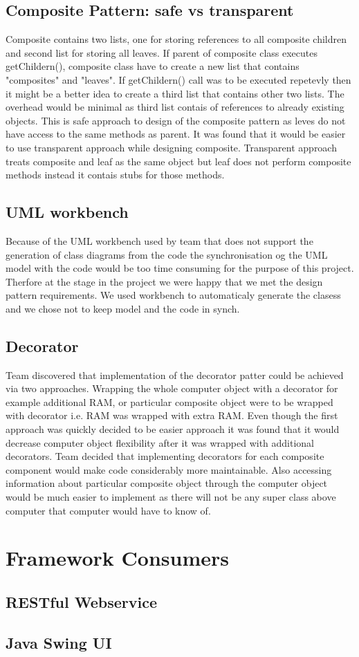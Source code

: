 \documentclass[pdftex,11pt,a4paper]{article}
\begin{document}
\subsection{Composite Pattern: safe vs transparent}
Composite contains two lists, one for storing references to all composite children and second list for storing all leaves. If parent of composite class executes getChildern(), composite class have to create a new list that contains "composites" and "leaves".
If getChildern() call was to be executed repetevly then it might be a better idea to create a third list that contains other two lists. The overhead would be minimal as third list contais of references to already existing objects.
This is safe approach to design of the composite pattern as leves do not have access to the same methods as parent. It was found that it would be easier to use transparent approach while designing composite. Transparent approach treats composite and leaf as the same object but leaf does not perform composite methods instead it contais stubs for those methods.

\subsection{UML workbench}
Because of the UML workbench used by team that does not support the generation of class diagrams from the code the synchronisation og the UML model with the code would be too time consuming for the purpose of this project. Therfore at the stage in the project we were happy that we met the design pattern requirements. We used workbench to automaticaly generate the clasess and we chose not to keep model and the code in synch.

\subsection{Decorator}

Team discovered that implementation of the decorator patter could be achieved via two approaches. Wrapping the whole computer object with a decorator for example additional RAM, or particular composite object were to be wrapped with decorator i.e. RAM was wrapped with extra RAM. Even though the first approach was quickly decided to be easier approach it was found that it would decrease computer object flexibility after it was wrapped with additional decorators. Team decided that implementing decorators for each composite component would make code considerably more maintainable. Also accessing information about particular composite object through the computer object would be much easier to implement as there will not be any super class above computer that computer would have to know of.


\section{Framework Consumers}

\subsection{RESTful Webservice}

\subsection{Java Swing UI}

\pagebreak

\def\refname{}


\end{document}
